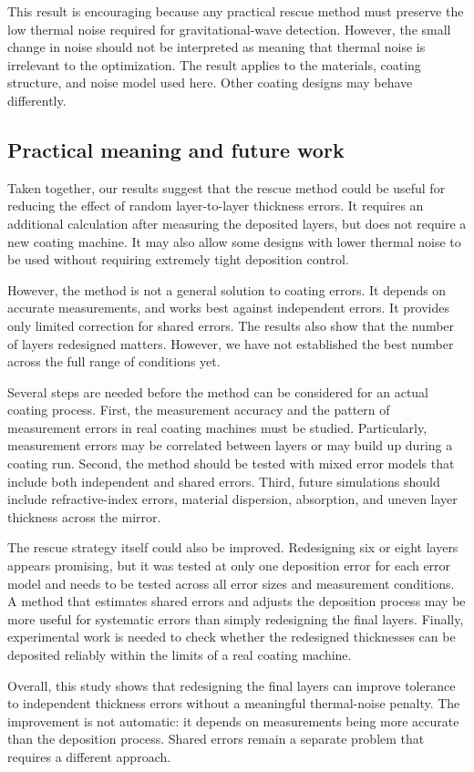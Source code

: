 This result is encouraging because any practical rescue method must preserve the low thermal noise required for gravitational-wave detection. However, the small change in noise should not be interpreted as meaning that thermal noise is irrelevant to the optimization. The result applies to the materials, coating structure, and noise model used here. Other coating designs may behave differently.

\subsection{Practical meaning and future work}

Taken together, our results suggest that the rescue method could be useful for reducing the effect of random layer-to-layer thickness errors. It requires an additional calculation after measuring the deposited layers, but does not require a new coating machine. It may also allow some designs with lower thermal noise to be used without requiring extremely tight deposition control.

However, the method is not a general solution to coating errors. It depends on accurate measurements, and works best against independent errors. It provides only limited correction for shared errors. The results also show that the number of layers redesigned matters. However, we have not established the best number across the full range of conditions yet.

Several steps are needed before the method can be considered for an actual coating process. First, the measurement accuracy and the pattern of measurement errors in real coating machines must be studied. Particularly, measurement errors may be correlated between layers or may build up during a coating run. Second, the method should be tested with mixed error models that include both independent and shared errors. Third, future simulations should include refractive-index errors, material dispersion, absorption, and uneven layer thickness across the mirror.

The rescue strategy itself could also be improved. Redesigning six or eight layers appears promising, but it was tested at only one deposition error for each error model and needs to be tested across all error sizes and measurement conditions. A method that estimates shared errors and adjusts the deposition process may be more useful for systematic errors than simply redesigning the final layers. Finally, experimental work is needed to check whether the redesigned thicknesses can be deposited reliably within the limits of a real coating machine.

Overall, this study shows that redesigning the final layers can improve tolerance to independent thickness errors without a meaningful thermal-noise penalty. The improvement is not automatic: it depends on measurements being more accurate than the deposition process. Shared errors remain a separate problem that requires a different approach.
